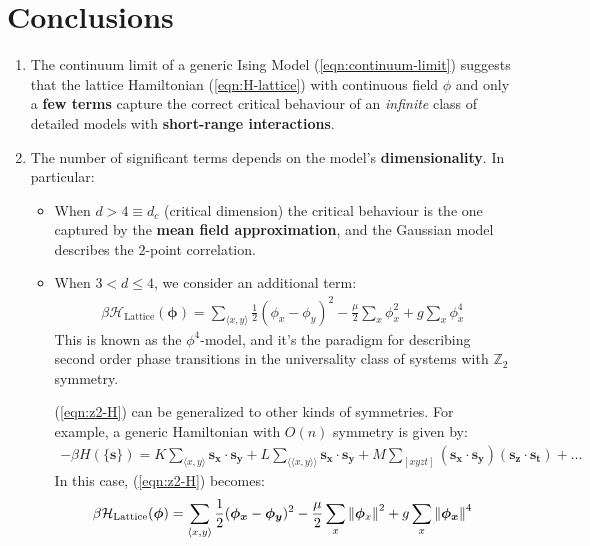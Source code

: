 \documentclass[../../main.tex]{subfiles}
\begin{document}
\section{Conclusions}
\begin{enumerate}
    \item The continuum limit of a generic Ising Model (\ref{eqn:continuum-limit}) suggests that the lattice Hamiltonian (\ref{eqn:H-lattice}) with continuous field $\phi$ and only a \textbf{few terms} capture the correct critical behaviour of an \textit{infinite} class of detailed models with \textbf{short-range interactions}.
    \item The number of significant terms depends on the model's \textbf{dimensionality}. In particular:
    \begin{itemize}
        \item When $d > 4 \equiv d_c$ (critical dimension) the critical behaviour is the one captured by the \textbf{mean field approximation}, and the Gaussian model describes the $2$-point correlation.
        \item When $3 < d \leq 4$, we consider an additional term:
        \begin{align} \label{eqn:z2-H}
            \beta \mathcal{H}_{\mathrm{Lattice}}(\bm{\phi}) = \sum_{\langle x,y \rangle} \frac{1}{2} (\phi_x - \phi_y)^2 -\frac{\mu}{2}\sum_x \phi_x^2 + g \sum_x \phi_x^4 
        \end{align}
        This is known as the $\phi^4$-model, and it's the paradigm for describing second order phase transitions in the universality class of systems with $\mathbb{Z}_2$ symmetry.

        \medskip

        (\ref{eqn:z2-H}) can be generalized to other kinds of symmetries. For example, a generic Hamiltonian with $O(n)$ symmetry is given by:
        \begin{align*}
            - \beta H(\{\bm{s}\}) = K \sum_{\langle x,y \rangle} \bm{s_x} \cdot \bm{s_y} + L \sum_{\langle \langle x,y \rangle \rangle} \bm{s_x} \cdot \bm{s_y} + M \sum_{[xyzt]} (\bm{s_x} \cdot \bm{s_y}) (\bm{s_z} \cdot \bm{s_t}) + \dots
        \end{align*}
        In this case, (\ref{eqn:z2-H}) becomes:
        \begin{align*}
            \beta \mathcal{H}_{\mathrm{Lattice}}(\bm{\phi}) = \sum_{\langle x,y \rangle} \frac{1}{2} (\bm{\phi_x} - \bm{\phi_y})^2 - \frac{\mu}{2} \sum_x \norm{\bm{\phi}_x}^2  + g\sum_x \norm{\bm{\phi_x}}^4 
        \end{align*}
    \end{itemize}
\end{enumerate}
\end{document}
